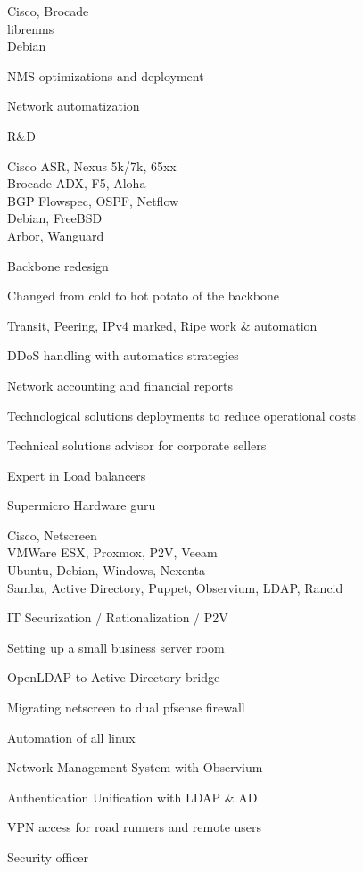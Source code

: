 \documentclass[a4paper,11pt]{cv4tw}%
\begin{document}
	{Cisco, Brocade\\librenms\\Debian}
		{
		\begin{missions}
			\item NMS optimizations and deployment
			\item Network automatization
			\item R\&D 
		\end{missions}
	}	

	{Cisco ASR, Nexus 5k/7k, 65xx\\Brocade ADX, F5, Aloha\\BGP Flowspec, OSPF, Netflow\\Debian, FreeBSD\\Arbor, Wanguard}
		{ Backbone redesign
		\begin{missions}
			\item Changed from cold to hot potato of the backbone
			\item Transit, Peering, IPv4 marked, Ripe work \& automation
			\item DDoS handling with automatics strategies
			\item Network accounting and financial reports
			\item Technological solutions deployments to reduce operational costs
			\item Technical solutions advisor for corporate sellers
			\item Expert in Load balancers
			\item Supermicro Hardware guru
		\end{missions}
	}

	{Cisco, Netscreen\\VMWare ESX, Proxmox, P2V, Veeam\\Ubuntu, Debian, Windows, Nexenta\\Samba, Active Directory, Puppet, Observium, LDAP, Rancid}
		{ IT Securization / Rationalization / P2V 
		\begin{missions}
			\item Setting up a small business server room
			\item OpenLDAP to Active Directory bridge
			\item Migrating netscreen to dual pfsense firewall
			\item Automation of all linux
			\item Network Management System with Observium
			\item Authentication Unification with LDAP \& AD
			\item VPN access for road runners and remote users
			\item Security officer
		\end{missions}
	}
\end{document}

